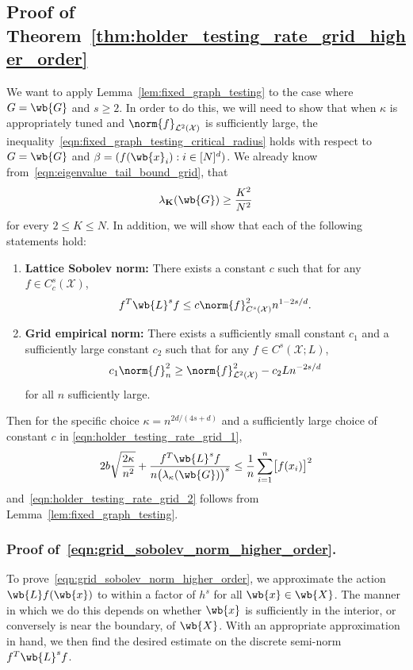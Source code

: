 \documentclass{article}
\newcommand{\1}{\mathbf{1}}
\newcommand{\Xset}{\mathcal{X}}
\newcommand{\Leb}{\mathcal{L}}
\theoremstyle{alden}
\theoremstyle{aldenthm}
\theoremstyle{definition}
\theoremstyle{remark}
\begin{document}
\subsection{Proof of Theorem~\ref{thm:holder_testing_rate_grid_higher_order}}
\label{subsec:holder_testing_rate_grid_ho_pf}
We want to apply Lemma~\ref{lem:fixed_graph_testing} to the case where $G = \wb{G}$ and $s \geq 2$. In order to do this, we will need to show that when $\kappa$ is appropriately tuned and $\norm{f}_{\Leb^2(\mathcal{X})}$ is sufficiently large, the inequality~\eqref{eqn:fixed_graph_testing_critical_radius} holds with respect to $G = \wb{G}$ and $\beta = (f(\wb{x}_i): i \in [N]^d)$. We already know  from~\eqref{eqn:eigenvalue_tail_bound_grid}, that
\begin{equation*}
\lambda_{\mathbf{K}}(\wb{G}) \geq \frac{K^2}{N^2}
\end{equation*}
for every $2 \leq K \leq N$. In addition, we will show that each of the following statements hold:
\begin{enumerate}[label=(E\arabic*)]
	\item
	\textbf{Lattice Sobolev norm:}
	\label{event:grid_sobolev_norm_higher_order}
	There exists a constant $c$ such that for any $f \in C_c^s(\Xset)$,
	\begin{equation}
	\label{eqn:grid_sobolev_norm_higher_order}
	f^T \wb{L}^s f \leq c \norm{f}_{C^s(\Xset)}^2 n^{1 - 2s/d}.
	\end{equation}	
	\item 
	\textbf{Grid empirical norm:}
	\label{event:grid_empirical_norm_higher_order}
	There exists a sufficiently small constant $c_1$ and a sufficiently large constant $c_2$ such that for any $f \in C^s(\Xset;L)$,
	\begin{equation}
	\label{eqn:grid_empirical_norm_higher_order}
	c_1 \norm{f}_n^2 \geq \norm{f}_{\Leb^2(\Xset)}^2 - c_2 L n^{-2s/d}
	\end{equation}
	for all $n$ sufficiently large.
\end{enumerate}
Then for the specific choice $\kappa = n^{2d/(4s + d)}$ and a sufficiently large choice of constant $c$ in \eqref{eqn:holder_testing_rate_grid_1},
\begin{align*}
2b\sqrt{\frac{2\kappa}{n^2}} + \frac{f^T \wb{L}^s f}{n\bigl(\lambda_{\kappa}(\wb{G})\bigr)^s} \leq \frac{1}{n}\sum_{i = 1}^{n}\bigl[f(x_i)\bigr]^2
\end{align*}
and~\eqref{eqn:holder_testing_rate_grid_2} follows from Lemma~\ref{lem:fixed_graph_testing}.

\subsubsection{Proof of~\eqref{eqn:grid_sobolev_norm_higher_order}.}
To prove~\eqref{eqn:grid_sobolev_norm_higher_order}, we approximate the action $\wb{L}f(\wb{x})$ to within a factor of $h^s$ for all $\wb{x} \in \wb{X}$. The manner in which we do this depends on whether $\wb{x}$ is sufficiently in the interior, or conversely is near the boundary, of $\wb{X}$. With an appropriate approximation in hand, we then find the desired estimate on the discrete semi-norm $f^T \wb{L}^s f$.
\end{document}
